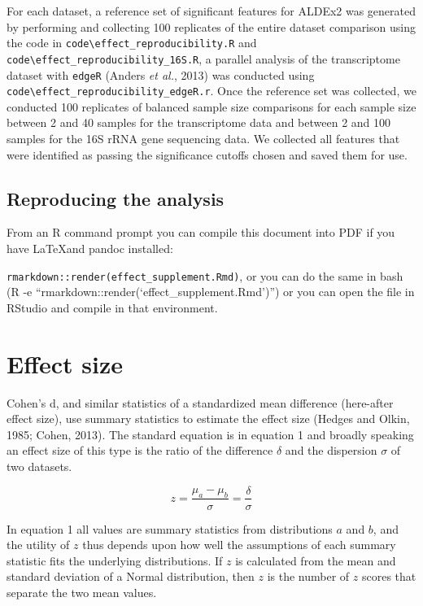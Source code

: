 \documentclass[onecolumn]{article}
\begin{document}
For each dataset, a reference set of significant features for ALDEx2 was
generated by performing and collecting 100 replicates of the entire
dataset comparison using the code in
\texttt{code\textbackslash{}effect\_reproducibility.R} and
\texttt{code\textbackslash{}effect\_reproducibility\_16S.R}, a parallel
analysis of the transcriptome dataset with \texttt{edgeR} (Anders
\emph{et al.}, 2013) was conducted using
\texttt{code\textbackslash{}effect\_reproducibility\_edgeR.r}. Once the
reference set was collected, we conducted 100 replicates of balanced
sample size comparisons for each sample size between 2 and 40 samples
for the transcriptome data and between 2 and 100 samples for the 16S
rRNA gene sequencing data. We collected all features that were
identified as passing the significance cutoffs chosen and saved them for
use.

\hypertarget{reproducing-the-analysis}{%
\subsection{Reproducing the analysis}\label{reproducing-the-analysis}}

From an R command prompt you can compile this document into PDF if you
have \LaTeX and pandoc installed:

\texttt{rmarkdown::render(\textquotesingle{}effect\_supplement.Rmd\textquotesingle{})},
or you can do the same in bash (R -e
``rmarkdown::render(`effect\_supplement.Rmd')'') or you can open the
file in RStudio and compile in that environment.

\clearpage

\hypertarget{effect-size}{%
\section{Effect size}\label{effect-size}}

Cohen's d, and similar statistics of a standardized mean difference
(here-after effect size), use summary statistics to estimate the effect
size (Hedges and Olkin, 1985; Cohen, 2013). The standard equation is in
equation 1 and broadly speaking an effect size of this type is the ratio
of the difference \(\delta\) and the dispersion \(\sigma\) of two
datasets.

\begin{equation}
    z = \frac{\mu_a - \mu_b}{\sigma} = \frac{\delta}{\sigma}
    \label{effect}
\end{equation}

In equation 1 all values are summary statistics from distributions \(a\)
and \(b\), and the utility of \(z\) thus depends upon how well the
assumptions of each summary statistic fits the underlying distributions.
If \(z\) is calculated from the mean and standard deviation of a Normal
distribution, then \(z\) is the number of \(z\) scores that separate the
two mean values.
\end{document}
